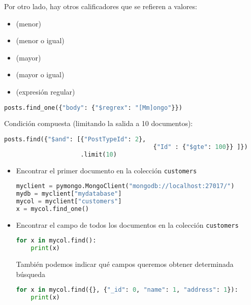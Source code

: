Por otro lado, hay otros calificadores que se refieren a valores:
\begin{itemize}
	\item {} (menor)
	\item {} (menor o igual)
	\item {} (mayor)
	\item {} (mayor o igual)
	\item {} (expresión regular)
\end{itemize}
\begin{lstlisting}[language=python]
posts.find_one({"body": {"$regrex": "[Mm]ongo"}})
\end{lstlisting}
Condición compuesta (limitando la salida a 10 documentos):
\begin{lstlisting}[language=python]
posts.find({"$and": [{"PostTypeId": 2},
										 {"Id" : {"$gte": 100}} ]})
					 .limit(10)
\end{lstlisting}
\begin{itemize}[leftmargin=*]
	\item Encontrar el primer documento en la colección \texttt{customers}
	\begin{lstlisting}[language=python]
myclient = pymongo.MongoClient("mongodb://localhost:27017/")
mydb = myclient["mydatabase"]
mycol = myclient["customers"]
x = mycol.find_one()
	\end{lstlisting}
	\item Encontrar el campo de todos los documentos en la colección \texttt{customers}
\begin{lstlisting}[language=python]
for x in mycol.find():
	print(x)
\end{lstlisting}
También podemos indicar qué campos queremos obtener determinada búsqueda
\begin{lstlisting}[language=python]
for x in mycol.find({}, {"_id": 0, "name": 1, "address": 1}):
	print(x)
\end{lstlisting}
\end{itemize}
